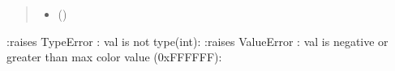 \documentclass[letterpaper,10pt,english]{sphinxmanual}
\begin{document}
\begin{fulllineitems}
\begin{fulllineitems}
\begin{quote}
\begin{description}
\begin{itemize}
\item {} 
\sphinxAtStartPar
{} () \textendash{} 

\end{itemize}

\end{description}\end{quote}

\sphinxAtStartPar
:raises TypeError : val is not type(int):
:raises ValueError : val is negative or greater than max color value (0xFFFFFF):

\end{fulllineitems}


\end{fulllineitems}

\end{document}

